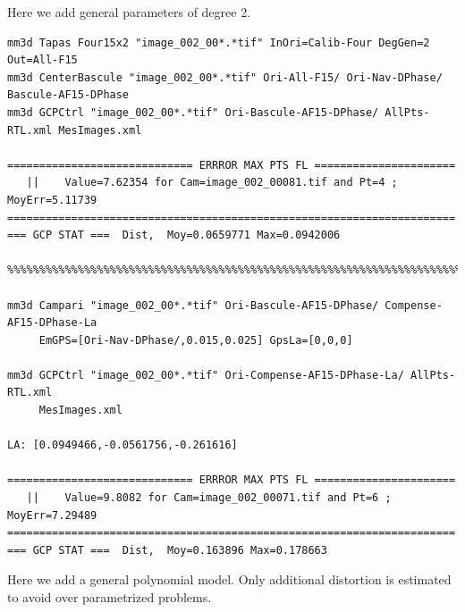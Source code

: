 Here we add general parameters of degree 2.

\begin{verbatim}
mm3d Tapas Four15x2 "image_002_00*.*tif" InOri=Calib-Four DegGen=2 Out=All-F15
mm3d CenterBascule "image_002_00*.*tif" Ori-All-F15/ Ori-Nav-DPhase/ Bascule-AF15-DPhase
mm3d GCPCtrl "image_002_00*.*tif" Ori-Bascule-AF15-DPhase/ AllPts-RTL.xml MesImages.xml

============================= ERRROR MAX PTS FL ======================
   ||    Value=7.62354 for Cam=image_002_00081.tif and Pt=4 ; MoyErr=5.11739
======================================================================
=== GCP STAT ===  Dist,  Moy=0.0659771 Max=0.0942006

%%%%%%%%%%%%%%%%%%%%%%%%%%%%%%%%%%%%%%%%%%%%%%%%%%%%%%%%%%%%%%%%%%%%%%%%%%%%%%%%%%%%%%%%%

mm3d Campari "image_002_00*.*tif" Ori-Bascule-AF15-DPhase/ Compense-AF15-DPhase-La 
     EmGPS=[Ori-Nav-DPhase/,0.015,0.025] GpsLa=[0,0,0]
     
mm3d GCPCtrl "image_002_00*.*tif" Ori-Compense-AF15-DPhase-La/ AllPts-RTL.xml 
     MesImages.xml

LA: [0.0949466,-0.0561756,-0.261616]

============================= ERRROR MAX PTS FL ======================
   ||    Value=9.8082 for Cam=image_002_00071.tif and Pt=6 ; MoyErr=7.29489
======================================================================
=== GCP STAT ===  Dist,  Moy=0.163896 Max=0.178663
\end{verbatim}


Here we add a general polynomial model. Only additional distortion is estimated to avoid over parametrized problems.

